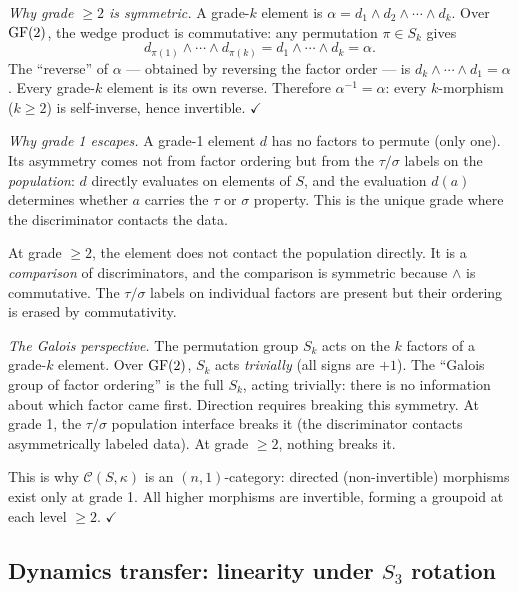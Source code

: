 \emph{Why grade $\geq 2$ is symmetric.}
A grade-$k$ element is $\alpha = d_1 \wedge d_2 \wedge
\cdots \wedge d_k$. Over $\operatorname{GF}(2)$, the wedge product is
commutative: any permutation $\pi \in S_k$ gives
\[
  d_{\pi(1)} \wedge \cdots \wedge d_{\pi(k)}
  = d_1 \wedge \cdots \wedge d_k = \alpha.
\]
The ``reverse'' of $\alpha$ --- obtained by reversing the
factor order --- is $d_k \wedge \cdots \wedge d_1 = \alpha$.
Every grade-$k$ element is its own reverse. Therefore
$\alpha^{-1} = \alpha$: every $k$-morphism ($k \geq 2$)
is self-inverse, hence invertible. $\checkmark$

\emph{Why grade 1 escapes.}
A grade-1 element $d$ has no factors to permute (only
one). Its asymmetry comes not from factor ordering but
from the $\tau/\sigma$ labels on the \emph{population}:
$d$ directly evaluates on elements of $S$, and the
evaluation $d(a)$ determines whether $a$ carries the
$\tau$ or $\sigma$ property. This is the unique grade
where the discriminator contacts the data.

At grade $\geq 2$, the element does not contact the
population directly. It is a \emph{comparison} of
discriminators, and the comparison is symmetric because
$\wedge$ is commutative. The $\tau/\sigma$ labels on
individual factors are present but their ordering is
erased by commutativity.

\emph{The Galois perspective.}
The permutation group $S_k$ acts on the $k$ factors of
a grade-$k$ element. Over $\operatorname{GF}(2)$, $S_k$ acts
\emph{trivially} (all signs are $+1$). The ``Galois
group of factor ordering'' is the full $S_k$, acting
trivially: there is no information about which factor
came first. Direction requires breaking this symmetry.
At grade 1, the $\tau/\sigma$ population interface
breaks it (the discriminator contacts asymmetrically
labeled data). At grade $\geq 2$, nothing breaks it.

This is why $\mathcal{C}(S,\kappa)$ is an
$(n,1)$-category: directed (non-invertible) morphisms
exist only at grade 1. All higher morphisms are
invertible, forming a groupoid at each level $\geq 2$.
$\checkmark$


\subsection{Dynamics transfer: linearity under $S_3$ rotation}
\label{app:dynamics-s3}

